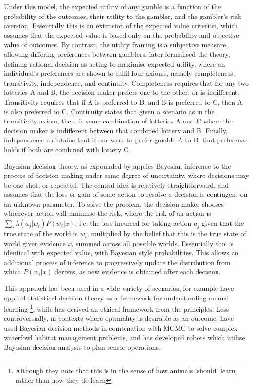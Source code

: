 Under this model, the expected utility of any gamble is a function
of the probability of the outcomes, their utility to the gambler,
and the gambler's risk aversion. Essentially this is an extension
of the expected value criterion, which assumes that the expected value
is based only on the probability and objective value of outcomes.
By contrast, the utility framing is a subjective measure, allowing
differing preferences between gamblers. \citet{Neumann1953} later
formalised the theory, defining rational decision as acting to maximise
expected utility, where an individual's preferences are shown to fulfil
four axioms, namely completeness, transitivity, independence, and
continuity. Completeness requires that for any two lotteries A and
B, the decision maker prefers one to the other, or is indifferent.
Transitivity requires that if A is preferred to B, and B is preferred
to C, then A is also preferred to C. Continuity states that given
a scenario as in the transitivity axiom, there is some combination
of lotteries A and C where the decision maker is indifferent between
that combined lottery and B. Finally, independence maintains that
if one were to prefer gamble A to B, that preference holds if both
are combined with lottery C.

Bayesian decision theory, as expounded by \citet{Robbins1964} applies
Bayesian inference to the process of decision making under some degree
of uncertainty, where decisions may be one-shot, or repeated.
The central idea is relatively straightforward, and assumes that the
loss or gain of some action to resolve a decision is contingent on
an unknown parameter. To solve the problem, the decision maker chooses
whichever action will minimise the risk, where the risk of an action
is $\underset{i}{\sum}\lambda(a_{j}|w_{i})P(w_{i}|x)$, i.e. the loss
incurred for taking action $a_{j}$ given that the true state of the
world is $w_{i}$, multiplied by the belief that this is the true
state of world given evidence $x$, summed across all possible worlds.
Essentially this is identical with expected value, with Bayesian style
probabilities. This allows an additional process of inference to progressively
update the distribution from which $P(w_{i}|x)$ derives, as new evidence
is obtained after each decision. 

This approach has been used in a wide variety of scenarios, for example
\citet{McNamara1980} have applied statistical decision theory as
a framework for understanding animal learning%
\footnote{Although they note that this is in the sense of how animals `should'
learn, rather than how they do learn%
}, while \citet{Harsanyi1978} has derived an ethical framework from
the principles. Less controversially, in contexts where optimality
is desirable as an outcome, \citet{Survey2003} have used Bayesian
decision methods in combination with \ac{MCMC} to solve complex waterfowl
habitat management problems, and \citet{Kristensen1997} has developed
robots which utilise Bayesian decision analysis to plan sensor operations.


